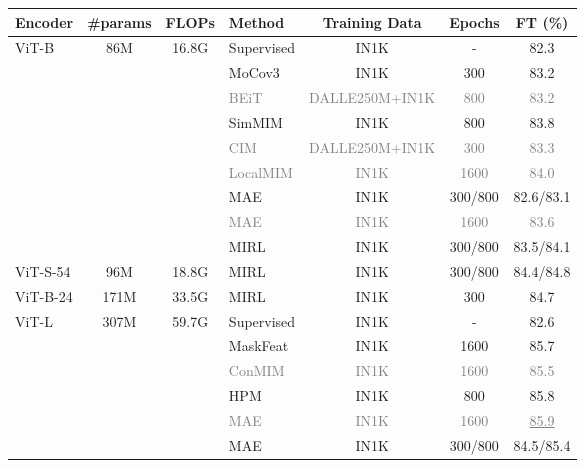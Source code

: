 \documentclass{article}
\begin{document}
\begin{table*}[t]
\small
\centering
\renewcommand{\arraystretch}{1.1}
\addtolength{\tabcolsep}{3.2pt}
\begin{tabular}{@{}l c c l c c c@{}}
    \toprule
    Encoder  & \#params & FLOPs  & Method & Training Data   & Epochs& FT (\%) \\
     \midrule
     \multirow{9}{*}{ViT-B} & \multirow{9}{*}{86M} & \multirow{9}{*}{16.8G} & Supervised & IN1K &  - & 82.3 \\
      & & & MoCov3 \cite{chen2021empirical}& IN1K  & 300 & 83.2   \\
& & &\textcolor{gray}{BEiT} \cite{bao2021beit} & \textcolor{gray}{DALLE250M+IN1K}    & \textcolor{gray}{800}  & \textcolor{gray}{83.2}   \\
      & & &SimMIM \cite{xie2021simmim} & IN1K  &  800 & 83.8  \\
& & & \textcolor{gray}{CIM} \cite{fang2022corrupted} & \textcolor{gray}{DALLE250M+IN1K}  &  \textcolor{gray}{300} & \textcolor{gray}{83.3}    \\
      & & & \textcolor{gray}{LocalMIM} \cite{wang2023masked} & \textcolor{gray}{IN1K}  &  \textcolor{gray}{1600} & \textcolor{gray}{84.0}    \\
      & && MAE \cite{he2022masked} & IN1K & 300/800 & 82.6/83.1  \\
      & && \textcolor{gray}{MAE} \cite{he2022masked} & \textcolor{gray}{IN1K}   &\textcolor{gray}{1600} & \textcolor{gray}{83.6}   \\
     & && MIRL  & IN1K & 300/800 & 83.5/84.1  \\
    \midrule
    ViT-S-54 &  96M & 18.8G & MIRL & IN1K  &  300/800 & 84.4/84.8  \\
    ViT-B-24  & 171M & 33.5G  & MIRL  & IN1K &  300 & 84.7  \\
    \midrule
     \multirow{6}{*}{ViT-L} &  \multirow{6}{*}{307M} & \multirow{6}{*}{59.7G} & Supervised & IN1K  & - & 82.6 \\
      & & &  MaskFeat \cite{wei2022masked} & IN1K & 1600 &  85.7   \\
      & & &\textcolor{gray}{ConMIM} \cite{yi2023masked} & \textcolor{gray}{IN1K}  & \textcolor{gray}{1600} & \textcolor{gray}{85.5}   \\
      & &&HPM  \cite{wang2023hard} & IN1K & 800 & 85.8   \\
      & &&\textcolor{gray}{MAE} \cite{he2022masked} & \textcolor{gray}{IN1K}  & \textcolor{gray}{1600} & \textcolor{gray}{\underline{85.9}}   \\
      & &&MAE  \cite{he2022masked} & IN1K & 300/800 & 84.5/85.4   \\
     


\end{tabular}
\end{table*}
\end{document}
